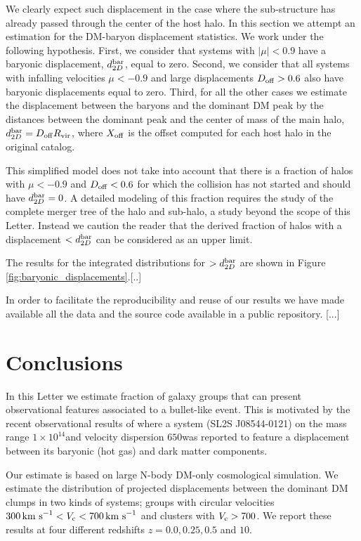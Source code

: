 \documentclass{emulateapj}
\newcommand{\hMsun}{{\ifmmode{h^{-1}{\rm {M_{\odot}}}}\else{$h^{-1}{\rm{M_{\odot}}}$}\fi}}
\newcommand{\kms}{{\ifmmode{{\mathrm{\,km\ s}^{-1}}}\else{\,km~s$^{-1}$}\fi}}
\newcommand{\bullg}{SL2S J08544-0121}
\begin{document}
We clearly expect such displacement in the case where the
sub-structure has already passed through the center of the host
halo. In this section we attempt an estimation for the DM-baryon
displacement statistics. We work under the following
hypothesis. First, we consider that systems with $|\mu|<0.9$ have a
baryonic displacement, $d_{2D}^{\rm bar}$, equal to zero. Second, we
consider that all systems with infalling velocities $\mu<-0.9$ and
large displacements $D_{\rm off}>0.6$ also have baryonic displacements
equal to zero. Third, for all the other cases we estimate the
displacement between the baryons and the dominant DM peak by the
distances between the dominant peak and the center of mass of the main
halo, $d_{2D}^{\rm bar}=D_{\rm off} R_{\rm vir}$, where $X_{\rm off}$
is the offset computed for each host halo in the original catalog.

This simplified model does not take into account that there is a
fraction of halos with $\mu<-0.9$ and $D_{\rm off}<0.6$ for which the
collision has not started and should have $d_{2D}^{\rm bar}=0$. A detailed
modeling of this fraction requires the study of the complete merger
tree of the halo and sub-halo, a study beyond the scope of this
Letter. Instead we caution the reader that the derived fraction of
halos with a displacement $<d_{2D}^{\rm bar}$ can be considered as an
upper limit. 

The results for the integrated distributions for $>d_{2D}^{\rm bar}$
are shown in Figure \ref{fig:baryonic_displacements}.[..]


In order to facilitate the reproducibility and reuse of our results we
have made available all the data and the source code available in a public
repository. [...]  


\section{Conclusions}
\label{sec:conclusions}

In this Letter we estimate fraction of galaxy groups
that can present observational features associated to a
bullet-like event. This is motivated by the recent observational
results of \citep{Gastaldello} where a system (\bullg) on the mass range
$1\times 10^{14}$\hMsun and velocity dispersion $650$\kms was reported
to feature a displacement between its baryonic (hot gas) and dark
matter components. 

Our estimate is based on large N-body DM-only cosmological
simulation. We estimate the distribution of projected displacements
between the dominant DM clumps in two kinds of systems; groups with circular
velocities $300\kms<V_{\rm c}<700\kms$ and clusters with $V_{\rm
  c}>700$\kms. We report these results at four different redshifts
$z=0.0,0.25,0.5$ and $10$.
\end{document}
